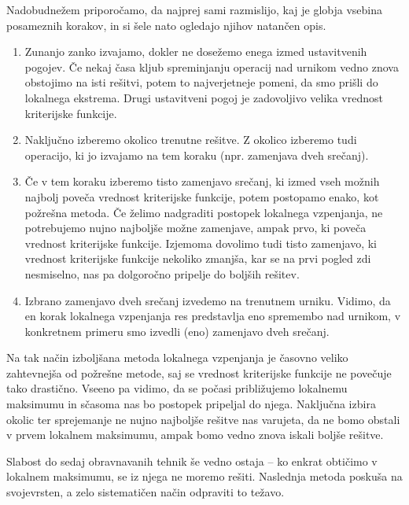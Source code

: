 \documentclass[a4paper,10pt]{article}
\begin{document}
\noindent
Nadobudnežem priporočamo, da najprej sami razmislijo, kaj je globja vsebina posameznih
korakov, in si šele nato ogledajo njihov natančen opis.


   
   \begin{enumerate}
      \item Zunanjo zanko izvajamo, dokler ne dosežemo enega izmed ustavitvenih pogojev.
      Če nekaj časa kljub spreminjanju operacij nad urnikom vedno znova obstojimo na isti
      rešitvi, potem to najverjetneje pomeni, da smo prišli do lokalnega ekstrema. Drugi
      ustavitveni pogoj je zadovoljivo velika vrednost kriterijske funkcije.
   
      \item Naključno izberemo okolico trenutne rešitve. Z okolico izberemo tudi operacijo,
      ki jo izvajamo na tem koraku (npr. zamenjava dveh srečanj).
   
      \item Če v tem koraku izberemo tisto zamenjavo srečanj, ki izmed vseh možnih najbolj
      poveča vrednost kriterijske funkcije, potem postopamo enako, kot požrešna metoda. Če
      želimo nadgraditi postopek lokalnega vzpenjanja, ne potrebujemo nujno najboljše možne
      zamenjave, ampak prvo, ki poveča vrednost kriterijske funkcije. Izjemoma dovolimo tudi
      tisto zamenjavo, ki vrednost kriterijske funkcije nekoliko zmanjša, kar se na prvi
      pogled zdi nesmiselno, nas pa dolgoročno pripelje do boljših rešitev.
   
      \item Izbrano zamenjavo dveh srečanj izvedemo na trenutnem urniku. Vidimo, da en korak
      lokalnega vzpenjanja res predstavlja eno spremembo nad urnikom, v konkretnem primeru
      smo izvedli (eno) zamenjavo dveh srečanj.
   \end{enumerate}

\noindent
Na tak način izboljšana metoda lokalnega vzpenjanja je časovno veliko zahtevnejša od
požrešne metode, saj se vrednost kriterijske funkcije ne povečuje tako drastično. Vseeno
pa vidimo, da se počasi približujemo lokalnemu maksimumu in sčasoma nas bo postopek
pripeljal do njega. Naključna izbira okolic ter sprejemanje ne nujno najboljše rešitve
nas varujeta, da ne bomo obstali v prvem lokalnem maksimumu, ampak bomo vedno znova
iskali boljše rešitve.

Slabost do sedaj obravnavanih tehnik še vedno ostaja -- ko enkrat obtičimo v lokalnem
maksimumu, se iz njega ne moremo rešiti. Naslednja metoda poskuša na svojevrsten, a zelo
sistematičen način odpraviti to težavo.
\end{document}
